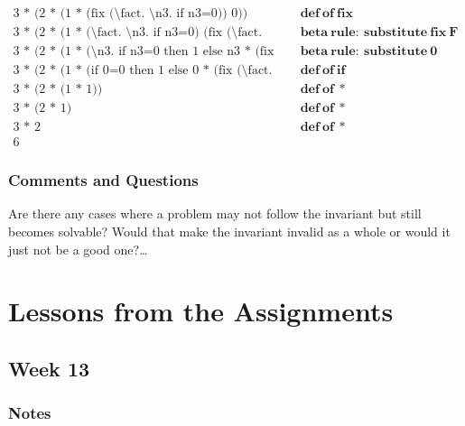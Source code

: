 \documentclass{article}
\theoremstyle{theorem}
\theoremstyle{definition}
\theoremstyle{remark}
\begin{document}
\begin{align*}
  \text{3 * (2 * (1 * (fix (\textbackslash fact. \textbackslash n3. if n3=0)) 0))} & \quad \mathbf{def\ of\ fix} \\
  \text{3 * (2 * (1 * (\textbackslash fact. \textbackslash n3. if n3=0) (fix (\textbackslash fact. \textbackslash n3. if n3=0)) 0))} & \quad \mathbf{beta\ rule:\ substitute\ fix\ F} \\
  \text{3 * (2 * (1 * (\textbackslash n3. if n3=0 then 1 else n3 * (fix (\textbackslash fact. \textbackslash n4. if n4=0)) (n3-1)) 0))} & \quad \mathbf{beta\ rule:\ substitute\ 0} \\
  \text{3 * (2 * (1 * (if 0=0 then 1 else 0 * (fix (\textbackslash fact. \textbackslash n4. if n4=0)) (0-1))))} & \quad \mathbf{def\ of\ if} \\
  \text{3 * (2 * (1 * 1))} & \quad \mathbf{def\ of\ *} \\
  \text{3 * (2 * 1)} & \quad \mathbf{def\ of\ *} \\
  \text{3 * 2} & \quad \mathbf{def\ of\ *} \\
  \text{6} &
\end{align*}


\subsubsection{Comments and Questions}

Are there any cases where a problem may not follow the invariant but still becomes solvable? Would that make the invariant invalid as a whole or would it just not be a good one?\ldots

\section{Lessons from the Assignments}

\subsection{Week 13}
\subsubsection{Notes}
\end{document}

